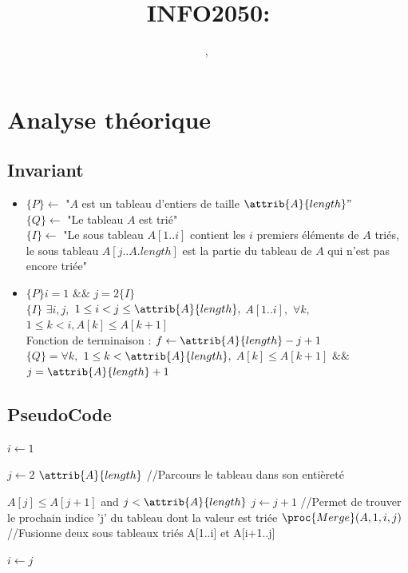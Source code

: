 \documentclass[a4paper, 11pt, oneside]{article}
\title{INFO2050: \intitule}
\author{\PrenomUN~\textsc{\NomUN}, \PrenomDEUX~\textsc{\NomDEUX}}
\date{}
\begin{document}
\maketitle
\newpage


	\section{Analyse théorique}
	\subsection{Invariant}
	\begin{itemize}[label=$\square$]

\item

	\noindent $\{P\} \gets$ "$A$ est un tableau d'entiers de taille $\attrib{A}{length}"$\\
	  $\{Q\} \gets$ "Le tableau $A$ est trié"\\ 
	$\{I\} \gets$ "Le sous tableau 
$A[1..i]$ contient les $i$ premiers éléments de $A$ triés, le sous tableau \indent \indent $A[j..A.length]$ est la partie du tableau de $A$ qui n'est pas encore triée"

\item $\{P\} i = 1$ $\&\&$ $j = 2 \{I\}$
\\ $\{I\}$  $\exists i,j,$ $1 \leq i < j \leq \attrib{A}{length},$  $A[1..i],$ $\forall k,$ $1 \leq k < i, A[k] \leq A[k+1]$ \\
\indent Fonction de terminaison : $f \gets \attrib{A}{length}-j +1$
\\ $\{Q\} = \forall k,$ $1 \leq k < \attrib{A}{length},$ $A[k] \leq A[k+1]$ $\&\&$ $j=\attrib{A}{length}+1$

\end{itemize}

	\subsection{PseudoCode}
	\label{PseudoCode}
	
	\begin{codebox}
\li $i \gets 1$

\li \For $j \gets 2$ \To $\attrib{A}{length}$ \color{Gray} //Parcours le tableau dans son entièreté
\Do

\li \While $A[j] \leq A[j+1]$ and $j < \attrib{A}{length}$
\li \Do
$j \gets j + 1$  \color{Gray} //Permet de trouver le prochain indice 'j' du tableau dont la valeur est triée
\End
\li $\proc{Merge}(A, 1, i, j)$  \color{Gray} //Fusionne deux sous tableaux triés A[1..i] et A[i+1..j]

\li $i \gets j$
\End
\end{codebox}
\end{document}
